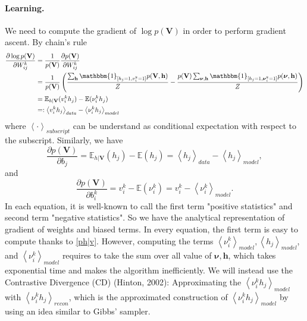\documentclass[bj, preprint]{imsart}
\newcommand{\cexp}[1]{\left<#1\right>}
\newcommand{\onebb}{\mathbbm{1}}
\newcommand{\Ebb}{\mathbb{E}}
\begin{document}
\paragraph{Learning.}\label{par:method.models.rbm.learning}

We need to compute the gradient of $\log p(\textbf{V})$ in order to perform gradient ascent. By chain's rule
\begin{align*}
\dfrac{\partial \log p(\textbf{V})}{\partial W_{ij}^{k}} &= \dfrac{1}{p(\textbf{V})} \dfrac{\partial p(\textbf{V})}{\partial W_{ij}^{k}} \\
& = \dfrac{1}{p(\textbf{V})} \left(\dfrac{\sum_{\textbf{h}} \onebb_{[h_j = 1, v_{i}^{k} = 1]} p(\textbf{V}, \textbf{h})}{Z} - \dfrac{p(\textbf{V}) \sum_{\boldsymbol{\nu}, \textbf{h}}\onebb_{[h_j = 1, \boldsymbol{\nu}_{i}^{k} = 1]} p(\boldsymbol{\nu}, \textbf{h})}{Z} \right)\\
& = \Ebb_{h|\textbf{V}}(v_i^k h_j) - \Ebb(\nu_i^k h_j)\\
& =: \cexp{v_i^k h_j}_{data} - \cexp{\nu_i^k h_j}_{model}
\end{align*}
where $\cexp{\cdot}_{subscript}$ can be understand as conditional expectation with respect to the subscript. 
Similarly, we have
\begin{equation}
\dfrac{\partial p(\textbf{V})}{\partial b_j}  = \Ebb_{h|\textbf{V}} (h_j) - \Ebb(h_j) =  \cexp{h_j}_{data} - \cexp{h_j}_{model},
\end{equation}
and 
\begin{equation}
\dfrac{\partial p(\textbf{V})}{\partial b_i^k}  = v_i^k - \Ebb(\nu_i^k) = v_i^k - \cexp{\nu_i^k}_{model}.
\end{equation}
In each equation, it is well-known to call the first term "positive statistics" and second term "negative statistics". So we have the analytical representation of gradient of weights and biased terms. In every equation, the first term is easy to compute thanks to \eqref{ph|v}. However, computing the terms $\cexp{\nu_{i}^{k}}_{model}, \cexp{h_j}_{model}$, and $\cexp{\nu_{i}^{k}}_{model}$ requires to take the sum over all value of $\boldsymbol{\nu}, \textbf{h}$, which takes exponential time and makes the algorithm inefficiently. We will instead use the Contrastive Divergence (CD) (Hinton, 2002): Approximating the $\cexp{\nu_i^k h_j}_{model}$ with $\cexp{\nu_i^k h_j}_{recon}$, which  is the approximated construction of $\cexp{\nu_i^k h_j}_{model}$ by using an idea similar to Gibbs' sampler.
\end{document}
